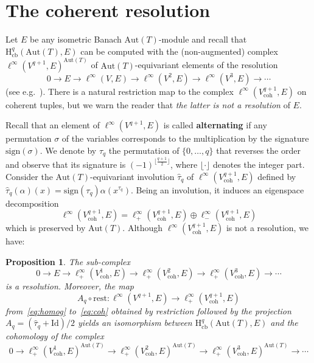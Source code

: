 \documentclass[11pt, a4paper]{amsart}
\newcommand{\Aut}{\mathrm{Aut}}
\newcommand{\coh}[1]{V_\mathrm{coh}^{#1}}
\newcommand{\hbc}{\mathrm{H}_\mathrm{cb}}
\theoremstyle{plain}
\newtheorem{prop}[thm]{Proposition}
\begin{document}
\section{The coherent resolution}%
Let $E$ be any isometric Banach $\Aut(T)$-module and recall that $\hbc^q(\Aut(T), E)$ can be computed with the (non-augmented) complex $\ell^\infty(V^{q+1}, E)^{\Aut(T)}$ of $\Aut(T)$-equivariant elements of the resolution
%
\begin{equation}\label{eq:homog}
0 \longrightarrow E \longrightarrow\ell^\infty(V, E) \longrightarrow \ell^\infty(V^2,E)  \longrightarrow \ell^\infty(V^3,E)  \longrightarrow \cdots
\end{equation}
%
(see e.g.~\cite[4.5.2]{Monod}). There is a natural restriction map to the complex $\ell^\infty(\coh{q+1}, E)$ on coherent tuples, but we warn the reader that \emph{the latter is not a resolution} of $E$.

Recall that an element of $\ell^\infty(V^{q+1}, E)$ is called \textbf{alternating} if any permutation $\sigma$ of the variables corresponds to the multiplication by the signature $\mathrm{sign}(\sigma)$. We denote by $\tau_q$ the permutation of $\{0, \ldots, q\}$ that reverses the order and observe that its signature is $(-1)^{\lfloor \frac{q+1}{2}\rfloor}$, where ${\lfloor \cdot\rfloor}$ denotes the integer part. Consider the $\Aut(T)$-equivariant involution $\hat\tau_q$ of $\ell^\infty(\coh{q+1}, E)$ defined by $\hat\tau_q (\alpha) (x) = \mathrm{sign}(\tau_q )\alpha(x^{\tau_q})$. Being an involution, it induces an eigenspace decomposition
%
$$\ell^\infty(\coh{q+1}, E) = \ell^\infty_+(\coh{q+1}, E) \oplus \ell^\infty_-(\coh{q+1}, E)$$
%
which is preserved by $\Aut(T)$. Although  $\ell^\infty(\coh{q+1}, E)$ is not a resolution, we have:

\begin{prop}\label{prop:comp}
The sub-complex
%
\begin{equation}\label{eq:coh}
0 \longrightarrow E \longrightarrow \ell^\infty_+(\coh 1, E) \longrightarrow \ell^\infty_+(\coh 2, E) \longrightarrow \ell^\infty_+(\coh 3, E) \longrightarrow \cdots
\end{equation}
%
is a resolution. Moreover, the map
%
$$A_q\circ \mathrm{rest} \colon \ell^\infty(V^{q+1}, E) \longrightarrow  \ell^\infty_+(\coh{q+1}, E)$$
%
from~\eqref{eq:homog} to~\eqref{eq:coh} obtained by restriction followed by the projection $A_q=(\hat\tau_q+\mathrm{Id})/2$ yields an isomorphism between $\hbc^q(\Aut(T), E)$ and the cohomology of the complex
%
\begin{equation}\label{eq:coh:inv}
0  \longrightarrow \ell^\infty_+(\coh 1, E)^{\Aut(T)} \longrightarrow \ell^\infty_+(\coh 2, E)^{\Aut(T)} \longrightarrow \ell^\infty_+(\coh 3, E)^{\Aut(T)} \longrightarrow \cdots
\end{equation}
%
\end{prop}
\end{document}
